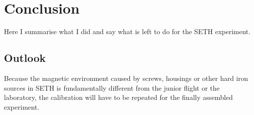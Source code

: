 \chapter{Conclusion \label{ch:conclusion}}
Here I summarise what I did and say what is left to do for the \ac{SETH} experiment.

\section{Outlook \label{sec:outlook}}
Because the magnetic environment caused by screws, housings or other hard iron sources in \ac{SETH} is fundamentally different from the junior flight or the laboratory, the calibration will have to be repeated for the finally assembled experiment.